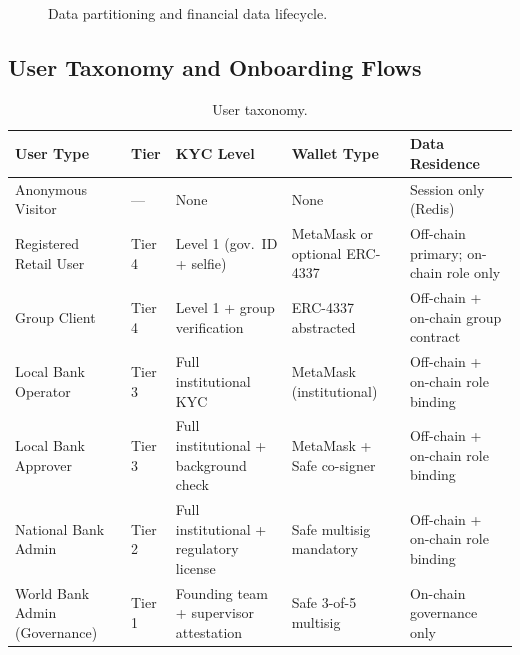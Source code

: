 \begin{figure}[H]
\centering
{}
\caption[Data partitioning and financial data lifecycle]{Data partitioning and financial data lifecycle.}
\label{fig:data-partitioning}
\label{fig:financial-data-lifecycle}
\end{figure}


\subsection{User Taxonomy and Onboarding Flows}
\label{sec:onboarding}
\label{sec:tiered-kyc}
\label{sec:identity}

\begin{table}[H]
\centering
\caption[User taxonomy]{User taxonomy.}
\label{tab:user-taxonomy}
\begin{tabular}{p{3.1cm}p{1.4cm}p{2.6cm}p{2.4cm}p{3.4cm}}
\toprule
\tableheadcolor
\textbf{User Type} & \textbf{Tier} & \textbf{KYC Level} & \textbf{Wallet Type} & \textbf{Data Residence} \\
\midrule
Anonymous Visitor & --- & None & None & Session only (Redis) \\
Registered Retail User & Tier 4 & Level 1 (gov.\ ID + selfie) & MetaMask or optional ERC-4337 & Off-chain primary; on-chain role only \\
Group Client & Tier 4 & Level 1 + group verification & ERC-4337 abstracted & Off-chain + on-chain group contract \\
Local Bank Operator & Tier 3 & Full institutional KYC & MetaMask (institutional) & Off-chain + on-chain role binding \\
Local Bank Approver & Tier 3 & Full institutional + background check & MetaMask + Safe co-signer & Off-chain + on-chain role binding \\
National Bank Admin & Tier 2 & Full institutional + regulatory license & Safe multisig mandatory & Off-chain + on-chain role binding \\
World Bank Admin (Governance) & Tier 1 & Founding team + supervisor attestation & Safe 3-of-5 multisig & On-chain governance only \\
\bottomrule
\end{tabular}
\end{table}

